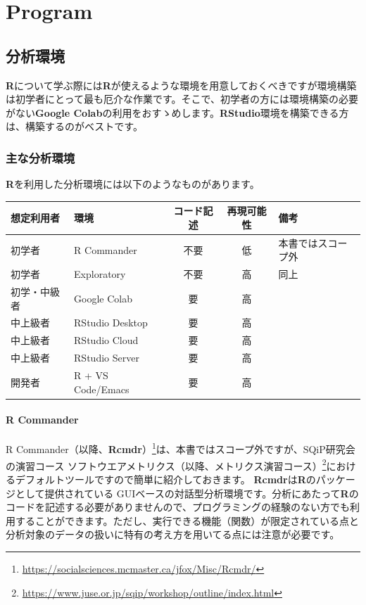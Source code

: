 \documentclass[
  12pt,
]{book}
\DeclareRobustCommand{\href}[2]{#2\footnote{\url{#1}}}
\begin{document}
\hypertarget{part-program}{%
\part{Program}\label{part-program}}

\hypertarget{ux5206ux6790ux74b0ux5883}{%
\chapter{分析環境}\label{ux5206ux6790ux74b0ux5883}}

\textbf{R}について学ぶ際には\textbf{R}が使えるような環境を用意しておくべきですが環境構築は初学者にとって最も厄介な作業です。そこで、初学者の方には環境構築の必要がない\textbf{Google Colab}の利用をおすゝめします。\textbf{RStudio}環境を構築できる方は、構築するのがベストです。

\hypertarget{ux4e3bux306aux5206ux6790ux74b0ux5883}{%
\section{主な分析環境}\label{ux4e3bux306aux5206ux6790ux74b0ux5883}}

\textbf{R}を利用した分析環境には以下のようなものがあります。

\begin{longtable}[]{@{}llccl@{}}
\toprule
想定利用者 & 環境 & コード記述 & 再現可能性 & 備考 \\
\midrule
\endhead
初学者 & R Commander & 不要 & 低 & 本書ではスコープ外 \\
初学者 & Exploratory & 不要 & 高 & 同上 \\
初学・中級者 & Google Colab & 要 & 高 & \\
中上級者 & RStudio Desktop & 要 & 高 & \\
中上級者 & RStudio Cloud & 要 & 高 & \\
中上級者 & RStudio Server & 要 & 高 & \\
開発者 & R + VS Code/Emacs & 要 & 高 & \\
\bottomrule
\end{longtable}

\hypertarget{r-commander}{%
\subsection{R Commander}\label{r-commander}}

\href{https://socialsciences.mcmaster.ca/jfox/Misc/Rcmdr/}{R Commander（以降、\textbf{Rcmdr}）}は、本書ではスコープ外ですが、\href{https://www.juse.or.jp/sqip/workshop/outline/index.html}{SQiP研究会の演習コース ソフトウエアメトリクス（以降、メトリクス演習コース）}におけるデフォルトツールですので簡単に紹介しておきます。 \textbf{Rcmdr}は\textbf{R}のパッケージとして提供されている GUIベースの対話型分析環境です。分析にあたって\textbf{R}のコードを記述する必要がありませんので、プログラミングの経験のない方でも利用することができます。ただし、実行できる機能（関数）が限定されている点と分析対象のデータの扱いに特有の考え方を用いてる点には注意が必要です。
\end{document}

